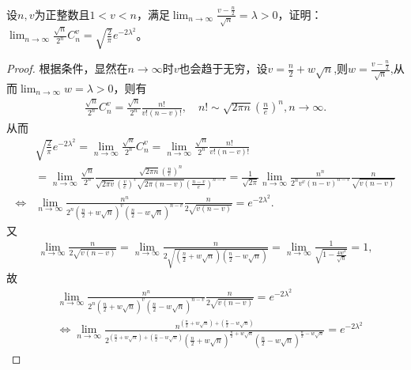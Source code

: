 \documentclass[../../main.tex]{subfiles}%
\begin{document}
\begin{example}
设\(n,v\)为正整数且\(1 < v < n\)，满足\(\lim_{n\rightarrow\infty}\frac{v-\frac{n}{2}}{\sqrt{n}}=\lambda>0\)，证明：\(\lim_{n\rightarrow\infty}\frac{\sqrt{n}}{2^n}C_n^v=\sqrt{\frac{2}{\pi}}e^{-2\lambda^2}\)。
\end{example}
\begin{proof}
根据条件，显然在\(n\rightarrow\infty\)时\(v\)也会趋于无穷，设\(v = \frac{n}{2}+w\sqrt{n}\),则$w=\frac{v-\frac{n}{2}}{\sqrt{n}}$,从而\(\lim_{n\rightarrow\infty}w=\lambda>0\)，则有
\begin{align*}
\frac{\sqrt{n}}{2^n}C_n^v=\frac{\sqrt{n}}{2^n}\frac{n!}{v!(n - v)!},\quad n!\sim\sqrt{2\pi n}\left(\frac{n}{e}\right)^n,n\to \infty.
\end{align*}
从而
\begin{align*}
&\sqrt{\frac{2}{\pi}}e^{-2\lambda ^2}=\lim_{n\rightarrow \infty} \frac{\sqrt{n}}{2^n}C_{n}^{v}=\underset{n\rightarrow \infty}{\lim}\frac{\sqrt{n}}{2^n}\frac{n!}{v!\left( n-v \right) !}
\\
&=\lim_{n\rightarrow \infty} \frac{\sqrt{n}}{2^n}\frac{\sqrt{2\pi n}\left( \frac{n}{e} \right) ^n}{\sqrt{2\pi v}\left( \frac{v}{e} \right) ^v\sqrt{2\pi (n-v)}\left( \frac{n-v}{e} \right) ^{n-v}}
=\frac{1}{\sqrt{2\pi}}\lim_{n\rightarrow \infty} \frac{n^n}{2^nv^v(n-v)^{n-v}}\frac{n}{\sqrt{v(n-v)}}
\\
\iff &\lim_{n\rightarrow \infty} \frac{n^n}{2^n\left( \frac{n}{2}+w\sqrt{n} \right) ^v\left( \frac{n}{2}-w\sqrt{n} \right) ^{n-v}}\frac{n}{2\sqrt{v(n-v)}}=e^{-2\lambda ^2}.
\end{align*}
又
\begin{align*}
\lim_{n\rightarrow \infty} \frac{n}{2\sqrt{v(n-v)}}=\lim_{n\rightarrow \infty} \frac{n}{2\sqrt{\left( \frac{n}{2}+w\sqrt{n} \right) \left( \frac{n}{2}-w\sqrt{n} \right)}}=\lim_{n\rightarrow \infty} \frac{1}{\sqrt{1-\frac{4w^2}{\sqrt{n}}}}=1,
\end{align*}
故
\begin{align}
&\lim_{n\rightarrow \infty} \frac{n^n}{2^n\left( \frac{n}{2}+w\sqrt{n} \right) ^v\left( \frac{n}{2}-w\sqrt{n} \right) ^{n-v}}\frac{n}{2\sqrt{v(n-v)}}=e^{-2\lambda ^2}
\nonumber
\\
&\iff \lim_{n\rightarrow \infty} \frac{n^{\left( \frac{n}{2}+w\sqrt{n} \right) +\left( \frac{n}{2}-w\sqrt{n} \right)}}{2^{\left( \frac{n}{2}+w\sqrt{n} \right) +\left( \frac{n}{2}-w\sqrt{n} \right)}\left( \frac{n}{2}+w\sqrt{n} \right) ^{\frac{n}{2}+w\sqrt{n}}\left( \frac{n}{2}-w\sqrt{n} \right) ^{\frac{n}{2}-w\sqrt{n}}}=e^{-2\lambda ^2}

\end{align}
\end{proof}
\end{document}

